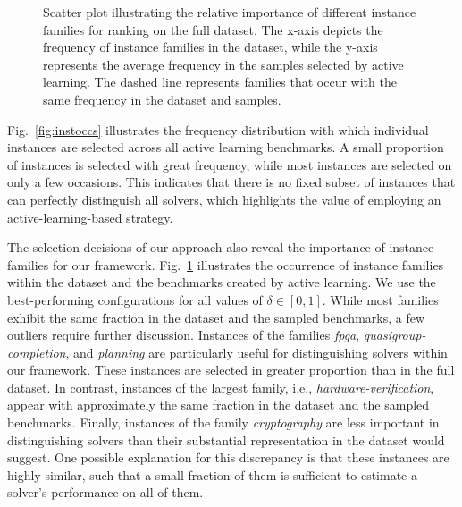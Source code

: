 \documentclass[sn-basic, Numbered]{sn-jnl} %
\begin{document}
\begin{figure}[tb]
  \centering
  \caption{
    Scatter plot illustrating the relative importance of different instance families for ranking on the full dataset. The x-axis depicts the frequency of instance families in the dataset, while the y-axis represents the average frequency in the samples selected by active learning. The dashed line represents families that occur with the same frequency in the dataset and samples.
  }
  \label{fig:annifinalfamilies}
\end{figure}

Fig.~\ref{fig:instoccs} illustrates the frequency distribution with which individual instances are selected across all active learning benchmarks.
A small proportion of instances is selected with great frequency, while most instances are selected on only a few occasions.
This indicates that there is no fixed subset of instances that can perfectly distinguish all solvers, which highlights the value of employing an active-learning-based strategy.

The selection decisions of our approach also reveal the importance of instance families for our framework.
Fig.~\ref{fig:annifinalfamilies} illustrates the occurrence of instance families within the dataset and the benchmarks created by active learning.
We use the best-performing configurations for all values of $\delta \in \left[0, 1\right]$.
While most families exhibit the same fraction in the dataset and the sampled benchmarks, a few outliers require further discussion.
Instances of the families \emph{fpga}, \emph{quasigroup-completion}, and \emph{planning} are particularly useful for distinguishing solvers within our framework.
These instances are selected in greater proportion than in the full dataset.
In contrast, instances of the largest family, i.e., \emph{hardware-verification}, appear with approximately the same fraction in the dataset and the sampled benchmarks.
Finally, instances of the family \emph{cryptography} are less important in distinguishing solvers than their substantial representation in the dataset would suggest.
One possible explanation for this discrepancy is that these instances are highly similar, such that a small fraction of them is sufficient to estimate a solver's performance on all of them.
\end{document}
